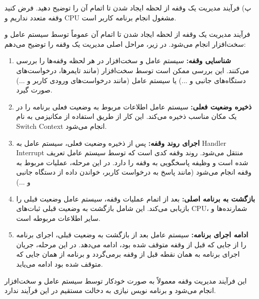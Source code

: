 پ) فرآیند مدیریت یک وقفه از لحظه ایجاد شدن تا اتمام آن را توضیح دهید. فرض کنید وقفه متعدد نداریم و CPU مشغول انجام برنامه کاربر است.
\begin{qsolve}
فرآیند مدیریت یک وقفه از لحظه ایجاد شدن تا اتمام آن عموماً توسط سیستم عامل و سخت‌افزار انجام می‌شود. در زیر، مراحل اصلی مدیریت یک وقفه را توضیح می‌دهم:
\begin{enumerate}
	\item \textbf{شناسایی وقفه:} سیستم عامل و سخت‌افزار در هر لحظه وقفه‌ها را بررسی می‌کنند. این بررسی ممکن است توسط سخت‌افزار (مانند تایمرها، درخواست‌های دستگاه‌های جانبی و ...) یا سیستم عامل (مانند درخواست‌های ورودی کاربر و ...) صورت گیرد.
	\item \textbf{ذخیره وضعیت فعلی:} سیستم عامل اطلاعات مربوط به وضعیت فعلی برنامه را در یک مکان مناسب ذخیره می‌کند. این کار از طریق استفاده از مکانیزمی به نام Switch Context انجام می‌شود.
	\item \textbf{اجرای روند وقفه:} پس از ذخیره وضعیت فعلی، سیستم عامل به Handler Interrupt منتقل می‌شود. روند وقفه کدی است که توسط سیستم عامل تعریف شده است و وظیفه پاسخگویی به وقفه را دارد. در این مرحله، عملیات مربوط به وقفه انجام می‌شود (مانند پاسخ به درخواست کاربر، خواندن داده از دستگاه جانبی و ...)
	\item \textbf{بازگشت به برنامه اصلی:} بعد از اتمام عملیات وقفه، سیستم عامل وضعیت قبلی را بازیابی می‌کند. این شامل بازگشت به وضعیت قبلی ثبات‌های CPU، شمارنده‌ها و سایر اطلاعات مربوطه است.
	\item \textbf{ادامه اجرای برنامه:} سیستم عامل بعد از بازگشت به وضعیت قبلی، اجرای برنامه را از جایی که قبل از وقفه متوقف شده بود، ادامه می‌دهد. در این مرحله، جریان اجرای برنامه به همان نقطه قبل از وقفه برمی‌گردد و برنامه از همان جایی که متوقف شده بود ادامه می‌یابد.
\end{enumerate}
این فرآیند مدیریت وقفه معمولاً به صورت خودکار توسط سیستم عامل و سخت‌افزار انجام می‌شود و برنامه نویس نیازی به دخالت مستقیم در این فرآیند ندارد.
	
\end{qsolve}